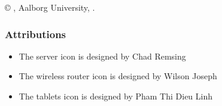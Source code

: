 \hypersetup{pageanchor=false} %
\thispagestyle{empty}
{\small
\strut\vfill
\noindent \copyright{} \groupname{}, Aalborg University, \MakeLowercase{\projectperiod{}}.\par
\vspace{0.3cm}
\subsubsection*{Attributions}
\begin{itemize}
  \item The server icon  is designed by Chad Remsing
  \item The wireless router icon  is designed by Wilson Joseph
  \item The tablets icon  is designed by Pham Thi Dieu Linh
\end{itemize}
}
\clearpage
\hypersetup{pageanchor=true} %